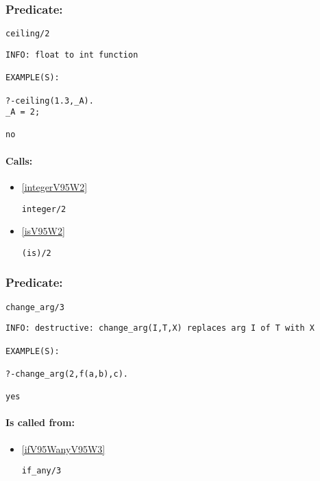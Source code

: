 \subsubsection{Predicate:} \label{ceilingV95W2}

\begin{verbatim}
ceiling/2
\end{verbatim}

{\small \begin{verbatim}
INFO: float to int function

EXAMPLE(S):

?-ceiling(1.3,_A).
_A = 2;

no

\end{verbatim}}
\paragraph{Calls:} 
\begin{itemize}
\item \ref{integerV95W2} 
\begin{verbatim}
integer/2
\end{verbatim}

\item \ref{isV95W2} 
\begin{verbatim}
(is)/2
\end{verbatim}

\end{itemize}

\subsubsection{Predicate:} \label{changeV95WargV95W3}

\begin{verbatim}
change_arg/3
\end{verbatim}

{\small \begin{verbatim}
INFO: destructive: change_arg(I,T,X) replaces arg I of T with X

EXAMPLE(S):

?-change_arg(2,f(a,b),c).

yes

\end{verbatim}}
\paragraph{Is called from:} 
\begin{itemize}
\item \ref{ifV95WanyV95W3} 
\begin{verbatim}
if_any/3
\end{verbatim}

\end{itemize}

